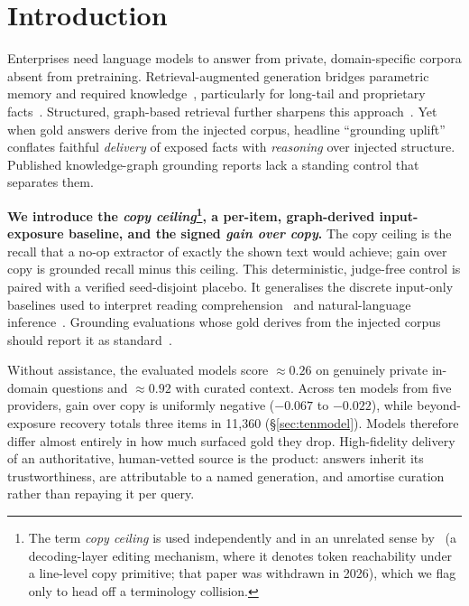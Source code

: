 \documentclass[10pt,twocolumn]{article}
\begin{document}
\section{Introduction}\label{sec:intro}
Enterprises need language models to answer from private, domain-specific corpora absent from pretraining. Retrieval-augmented generation bridges parametric memory and required knowledge~\cite{lewis2020rag,gao2023ragsurvey}, particularly for long-tail and proprietary facts~\cite{mallen2023trust}. Structured, graph-based retrieval further sharpens this approach~\cite{edge2024graphrag,guo2024lightrag,baek2023kaping,pan2024unifying}. Yet when gold answers derive from the injected corpus, headline ``grounding uplift'' conflates faithful \emph{delivery} of exposed facts with \emph{reasoning} over injected structure. Published knowledge-graph grounding reports lack a standing control that separates them.

\textbf{We introduce the \emph{copy ceiling}\footnote{The term \emph{copy ceiling} is used independently and in an unrelated sense by~\textcite{copyasdecode2026} (a decoding-layer editing mechanism, where it denotes token reachability under a line-level copy primitive; that paper was withdrawn in 2026), which we flag only to head off a terminology collision.}, a per-item, graph-derived input-exposure baseline, and the signed \emph{gain over copy}.} The copy ceiling is the recall that a no-op extractor of exactly the shown text would achieve; gain over copy is grounded recall minus this ceiling. This deterministic, judge-free control is paired with a verified seed-disjoint placebo. It generalises the discrete input-only baselines used to interpret reading comprehension~\cite{kaushik2018reading} and natural-language inference~\cite{gururangan2018artifacts,poliak2018hypothesis}. Grounding evaluations whose gold derives from the injected corpus should report it as standard~\cite{laitenberger2025stronger,min2023factscore}.

Without assistance, the evaluated models score $\approx0.26$ on genuinely private in-domain questions and $\approx0.92$ with curated context. Across ten models from five providers, gain over copy is uniformly negative ($-0.067$ to $-0.022$), while beyond-exposure recovery totals three items in 11{,}360 (\S\ref{sec:tenmodel}). Models therefore differ almost entirely in how much surfaced gold they drop. High-fidelity delivery of an authoritative, human-vetted source is the product: answers inherit its trustworthiness, are attributable to a named generation, and amortise curation rather than repaying it per query.
\end{document}
